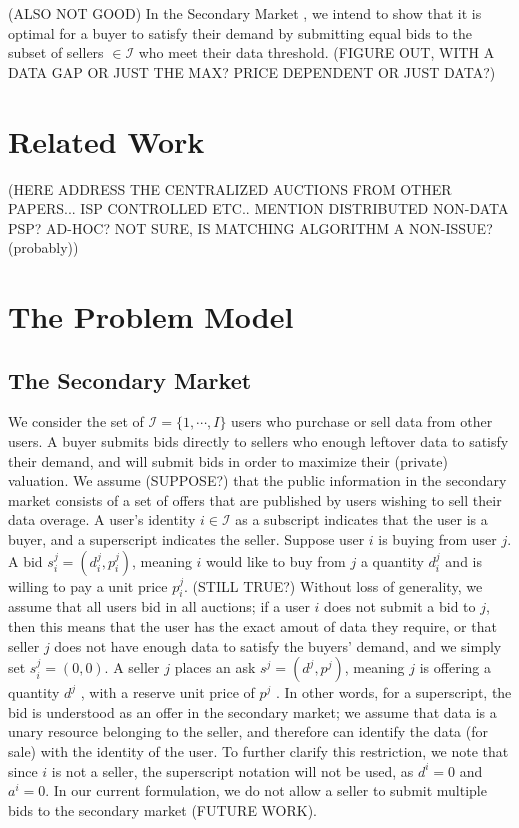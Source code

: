 \documentclass[12pt]{article}
\theoremstyle{definition}
\newcommand{\mcI}{\mathcal{I}}
\begin{document}
\begin{multicols}{2}
(ALSO NOT GOOD)
In the Secondary Market \cite{zheng}, we intend to show that it is optimal for a
buyer to satisfy their demand by submitting equal bids to the subset of sellers
$\in \mcI$ who
meet their data threshold. (FIGURE OUT, WITH A
DATA GAP OR JUST THE MAX? PRICE DEPENDENT OR JUST DATA?)

\section{Related Work}
(HERE ADDRESS THE CENTRALIZED AUCTIONS FROM OTHER PAPERS... ISP CONTROLLED
ETC.. MENTION DISTRIBUTED NON-DATA PSP? AD-HOC? NOT SURE, IS MATCHING ALGORITHM
A NON-ISSUE? (probably)) 

\section{The Problem Model}
\subsection{The Secondary Market}

We consider the set of $\mcI = \lbrace 1, \cdots, I\rbrace$ users who purchase or sell
data from other users. A buyer submits bids directly to sellers who enough leftover data
to satisfy their demand, and will submit bids in order to maximize their
(private) valuation. We assume (SUPPOSE?) that the public information in the
secondary market consists of a set of offers that are published by users
wishing to sell their data overage. 
A user's identity $i \in \mcI$ as a subscript indicates that the user
is a buyer, and a superscript indicates the seller.
Suppose user $i$ is buying from user $j$. A bid $s_i^j = (d_i^j, p_i^j)$,
meaning $i$ would like to buy from $j$ a quantity $d^j_i$ and is willing to pay
a unit price $p^j_i$. (STILL TRUE?) Without loss of generality, we assume that all users bid in all
auctions; if a user $i$ does not submit a bid to $j$, then this means that
the user has the exact amout of data they require, or that seller $j$ does not have
enough data to satisfy the buyers' demand, and we simply set $s_i^j = (0, 0)$.
A seller $j$ places an ask $s^j = (d^j, p^j)$, meaning $j$ is offering a
quantity $d^j$ , with a reserve unit price of $p^j$ . In other words, for a
superscript, the bid is understood as an offer in the secondary
market; we assume that data is a unary resource belonging to the seller, and
therefore can identify the data (for sale) with the identity of the user.
To further clarify this restriction, we note that since $i$ is not a seller,
the superscript notation will not be used, as $d^i = 0$ and
$a^i = 0$. In our current formulation, we do not allow a seller to submit
multiple bids to the secondary market (FUTURE WORK).


\end{multicols}
\end{document}
